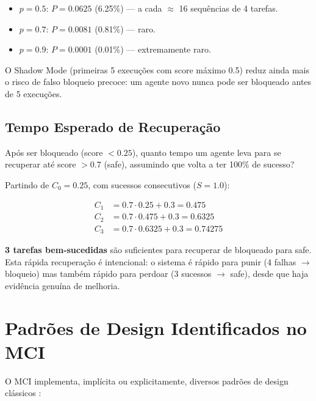 \begin{itemize}
    \item $p = 0.5$: $P = 0.0625$ (6.25\%) — a cada $\approx$ 16 sequências de 4 tarefas.
    \item $p = 0.7$: $P = 0.0081$ (0.81\%) — raro.
    \item $p = 0.9$: $P = 0.0001$ (0.01\%) — extremamente raro.
\end{itemize}

O Shadow Mode (primeiras 5 execuções com score máximo 0.5) reduz ainda mais o risco de falso bloqueio precoce: um agente novo nunca pode ser bloqueado antes de 5 execuções.

\subsection{Tempo Esperado de Recuperação}

Após ser bloqueado (score $< 0.25$), quanto tempo um agente leva para se recuperar até score $> 0.7$ (safe), assumindo que volta a ter 100\% de sucesso?

Partindo de $C_0 = 0.25$, com sucessos consecutivos ($S = 1.0$):

\begin{align}
C_1 &= 0.7 \cdot 0.25 + 0.3 = 0.475 \\
C_2 &= 0.7 \cdot 0.475 + 0.3 = 0.6325 \\
C_3 &= 0.7 \cdot 0.6325 + 0.3 = 0.74275
\end{align}

\textbf{3 tarefas bem-sucedidas} são suficientes para recuperar de bloqueado para safe. Esta rápida recuperação é intencional: o sistema é rápido para punir (4 falhas $\rightarrow$ bloqueio) mas também rápido para perdoar (3 sucessos $\rightarrow$ safe), desde que haja evidência genuína de melhoria.

\section{Padrões de Design Identificados no MCI}
\label{sec:design-patterns}

O MCI implementa, implícita ou explicitamente, diversos padrões de design clássicos \cite{Gamma1994_DesignPatterns}:

